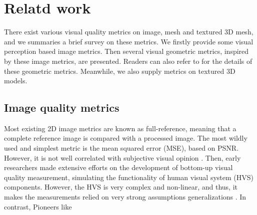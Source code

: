 \section{Relatd work}
There exist various visual quality metrics on image, mesh and textured 3D mesh, and we summaries a brief survey on these metrics. We firstly provide some visual perception based image metrics. Then several visual geometric metrics, inspired by these image metrics, are presented. Readers can also refer to \cite{Corsini_2013} for the details of these geometric metrics.  Meanwhile, we also supply metrics on textured 3D models. 
\subsection{Image quality metrics}
Most existing 2D image metrics are known as full-reference, meaning that a complete reference image is compared with a processed image.  The most wildly used and simplest metric is the mean squared error (MSE), based on PSNR. However, it is not well correlated with subjective visual opinion \cite{Snyder_1985} \cite{Teo}. Then, early researchers \cite{Mannos_1974} made extensive efforts on the development of bottom-up visual quality measurement, simulating the functionality of human visual system (HVS) components. However, the HVS is very complex and non-linear, and thus, it makes the measurements relied on very strong assumptions generalizations \cite{Wang_2004}. In contrast, Pioneers like

